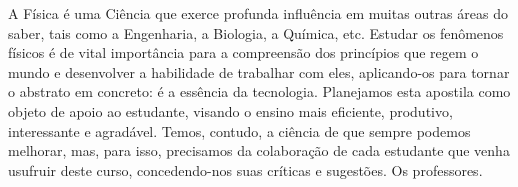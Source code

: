 
\AddToShipoutPicture{\BackgroundPic} 


\imprimircapa


\imprimirfolhaderosto


\begin{resumo}[Prefácio]
A Física é uma Ciência que exerce profunda influência em muitas outras áreas do saber, tais como a Engenharia, a Biologia, a Química, etc. Estudar os fenômenos físicos é de vital importância para a compreensão dos princípios que regem o mundo e desenvolver a habilidade de trabalhar com eles, aplicando-os para tornar o abstrato em concreto: é a essência da tecnologia. 
Planejamos esta apostila como objeto de apoio ao estudante, visando o ensino mais eficiente, produtivo, interessante e agradável.
Temos, contudo, a ciência de que sempre podemos melhorar, mas, para isso, precisamos da colaboração de cada estudante que venha usufruir deste curso, concedendo-nos suas críticas e sugestões.
\vspace{1cm}                            
\hfill Os professores.
\end{resumo}


\listoffigures*
\cleardoublepage


\listoftables*
\cleardoublepage


\tableofcontents*
\cleardoublepage


\textual

